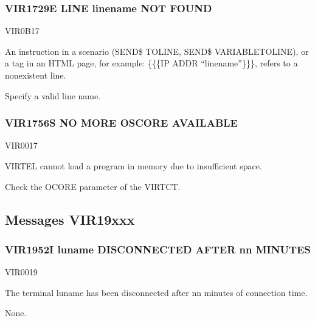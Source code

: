 \documentclass[letterpaper,10pt,english]{sphinxmanual}
\begin{document}
\subsubsection{VIR1729E LINE linename NOT FOUND}
\label{\detokenize{messages:vir1729e-line-linename-not-found}}\begin{description}
\sphinxAtStartPar
VIR0B17

\sphinxAtStartPar
An instruction in a scenario (SEND\$ TO\sphinxhyphen{}LINE, SEND\$ VARIABLE\sphinxhyphen{}TO\sphinxhyphen{}LINE), or a tag in an HTML page, for example: \{\{\{IP\sphinxhyphen{} ADDR “linename”\}\}\}, refers to a non\sphinxhyphen{}existent line.

\sphinxAtStartPar
Specify a valid line name.

\end{description}


\subsubsection{VIR1756S NO MORE OSCORE AVAILABLE}
\label{\detokenize{messages:vir1756s-no-more-oscore-available}}\begin{description}
\sphinxAtStartPar
VIR0017

\sphinxAtStartPar
VIRTEL cannot load a program in memory due to insufficient space.

\sphinxAtStartPar
Check the OCORE parameter of the VIRTCT.

\end{description}


\subsection{Messages VIR19xxx}
\label{\detokenize{messages:messages-vir19xxx}}

\subsubsection{VIR1952I luname DISCONNECTED AFTER nn MINUTES}
\label{\detokenize{messages:vir1952i-luname-disconnected-after-nn-minutes}}\begin{description}
\sphinxAtStartPar
VIR0019

\sphinxAtStartPar
The terminal luname has been disconnected after nn minutes of connection time.

\sphinxAtStartPar
None.

\end{description}
\end{document}
